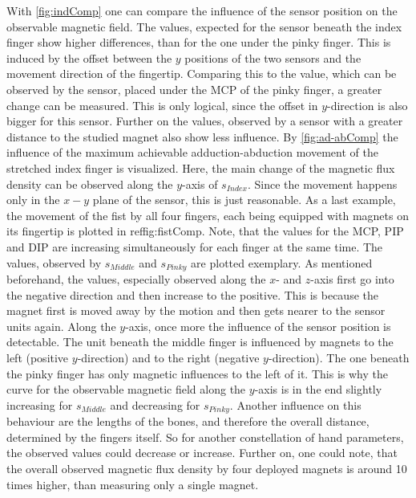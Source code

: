 With \ref{fig:indComp} one can compare the influence of the sensor position on the observable magnetic field. The values, expected for the sensor beneath the index finger show higher differences, than for the one under the pinky finger. This is induced by the offset between the $ y $ positions of the two sensors and the movement direction of the fingertip. Comparing this to the value, which can be observed by the sensor, placed under the \ac{MCP} of the pinky finger, a greater change can be measured. This is only logical, since the offset in $ y $-direction is also bigger for this sensor. Further on the values, observed by a sensor with a greater distance to the studied magnet also show less influence. By \ref{fig:ad-abComp} the influence of the maximum achievable adduction-abduction movement of the stretched index finger is visualized. Here, the main change of the magnetic flux density can be observed along the $ y $-axis of $ s_{Index} $. Since the movement happens only in the $ x-y $ plane of the sensor, this is just reasonable. As a last example, the movement of the fist by all four fingers, each being equipped with magnets on its fingertip is plotted in ref{fig:fistComp}. Note, that the values for the \ac{MCP}, \ac{PIP} and \ac{DIP} are increasing simultaneously for each finger at the same time. The values, observed by $ s_{Middle} $ and $ s_{Pinky} $ are plotted exemplary. As mentioned beforehand, the values, especially observed along the $ x $- and $ z $-axis first go into the negative direction and then increase to the positive. This is because the magnet first is moved \grqq away \grqq by the motion and then gets nearer to the sensor units again. Along the $ y $-axis, once more the influence of the sensor position is detectable. The unit beneath the middle finger is influenced by magnets to the left (positive $ y $-direction) and to the right (negative $ y $-direction). The one beneath the pinky finger has only magnetic influences to the left of it. This is why the curve for the observable magnetic field along the $ y $-axis is in the end slightly increasing for $ s_{Middle} $ and decreasing for $ s_{Pinky} $. Another influence on this behaviour are the lengths of the bones, and therefore the overall distance, determined by the fingers itself. So for another constellation of hand parameters, the observed values could decrease or increase. Further on, one could note, that the overall observed magnetic flux density by four deployed magnets is around 10 times higher, than measuring only a single magnet.\\
